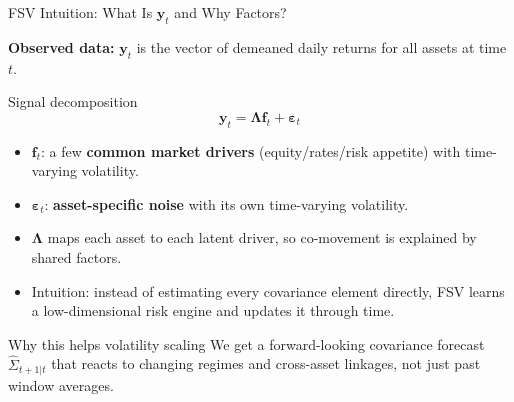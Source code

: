 \documentclass[10pt]{beamer}\usepackage[]{graphicx}\usepackage[table]{xcolor}
\begin{document}
\begin{frame}{FSV Intuition: What Is $\mathbf{y}_t$ and Why Factors?}

  \textbf{Observed data:} $\mathbf{y}_t$ is the vector of demeaned daily returns for all assets at time $t$.

  \vspace{0.4em}
  \begin{alertblock}{Signal decomposition}
    \[
      \mathbf{y}_t=\boldsymbol{\Lambda}\mathbf{f}_t+\boldsymbol{\varepsilon}_t
    \]
  \end{alertblock}

  \begin{itemize}
    \setlength\itemsep{0.6em}
    \item $\mathbf{f}_t$: a few \textbf{common market drivers} (equity/rates/risk appetite) with time-varying volatility.
    \item $\boldsymbol{\varepsilon}_t$: \textbf{asset-specific noise} with its own time-varying volatility.
    \item $\boldsymbol{\Lambda}$ maps each asset to each latent driver, so co-movement is explained by shared factors.
    \item Intuition: instead of estimating every covariance element directly, FSV learns a low-dimensional risk engine and updates it through time.
  \end{itemize}

  \vspace{0.2em}
  \begin{block}{Why this helps volatility scaling}
    We get a forward-looking covariance forecast $\hat{\Sigma}_{t+1|t}$ that reacts to changing regimes and cross-asset linkages, not just past window averages.
  \end{block}

\end{frame}

\end{document}
